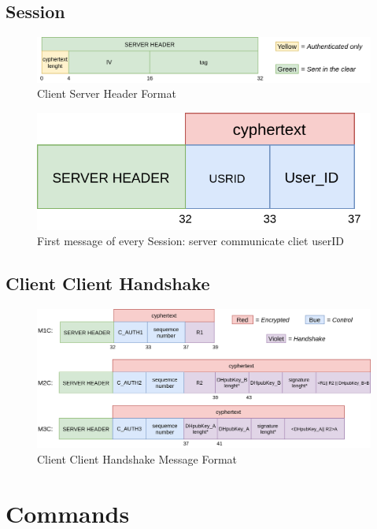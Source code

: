 \documentclass[11pt]{report}
\begin{document}
\subsection*{Session}
\begin{figure}[H]
	\centering
	\includegraphics[scale=0.28]{img/HeaderFormat.png}
	\caption{Client Server Header Format}
	\label {img: FormatClientServerHeader}
\end{figure}
\begin{figure}[H]
	\centering
	\includegraphics[scale=0.28]{img/SessionFirstMessageFormat.png}
	\caption{First message of every Session: server communicate cliet userID}
	\label {img: FormatClientServerFirst}
\end{figure}
\subsection*{Client Client Handshake}
\begin{figure}[H]
	\centering
	\includegraphics[scale=0.28]{img/AuthClientClient_messageFormat.png}
	\caption{Client Client Handshake Message Format}
	\label {img: FormatClientClient}
\end{figure}

\section{Commands}
\end{document}

